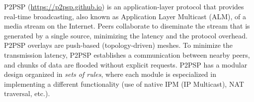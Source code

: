 P2PSP (\url{https://p2psp.github.io}) is an application-layer protocol
that provides real-time broadcasting, also known as Application Layer
Multicast (ALM), of a media stream on the Internet. Peers collaborate
to diseminate the stream that is generated by a single source,
minimizing the latency and the protocol overhead. P2PSP overlays are
push-based (topology-driven) meshes. To minimize the transmission
latency, P2PSP establishes a communication between nearby peers, and
chunks of data are flooded without explicit requests. P2PSP has a
modular design organized in \emph{sets of rules}, where each module is
especialized in implementing a different functionality (use of native
IPM (IP Multicast), NAT traversal, etc.).
